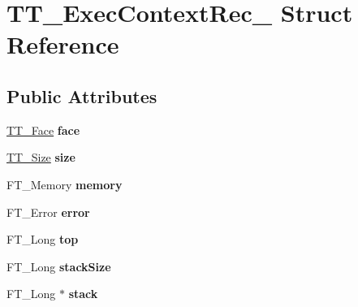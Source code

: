 \hypertarget{struct_t_t___exec_context_rec__}{}\section{T\+T\+\_\+\+Exec\+Context\+Rec\+\_\+ Struct Reference}
\label{struct_t_t___exec_context_rec__}
\subsection*{Public Attributes}
\begin{DoxyCompactItemize}
\item 
\mbox{\label{struct_t_t___exec_context_rec___adcce6cbc8fe23cad71af4238c056eab5}} 
\hyperlink{struct_t_t___face_rec__}{T\+T\+\_\+\+Face} {\bfseries face}
\item 
\mbox{\label{struct_t_t___exec_context_rec___a630680b65f57187b234058c07317676b}} 
\hyperlink{struct_t_t___size_rec__}{T\+T\+\_\+\+Size} {\bfseries size}
\item 
\mbox{\label{struct_t_t___exec_context_rec___a009291182576f93e0a38a8ca6947622c}} 
F\+T\+\_\+\+Memory {\bfseries memory}
\item 
\mbox{\label{struct_t_t___exec_context_rec___ad247870028ca02b7a9d8d704e936c00a}} 
F\+T\+\_\+\+Error {\bfseries error}
\item 
\mbox{\label{struct_t_t___exec_context_rec___a857cf9b28b03c0c4a5e0999d6fa53d0d}} 
F\+T\+\_\+\+Long {\bfseries top}
\item 
\mbox{\label{struct_t_t___exec_context_rec___a2bbcc0222a3445aa96e1f857e6b95768}} 
F\+T\+\_\+\+Long {\bfseries stack\+Size}
\item 
\mbox{\label{struct_t_t___exec_context_rec___ae2e5fe62a9160180ec5ad651fc398219}} 
F\+T\+\_\+\+Long $\ast$ {\bfseries stack}
\item 
\mbox{\label{struct_t_t___exec_context_rec___a12ef7842ca59c9f35411230ad689e23d}} 

\end{DoxyCompactItemize}
